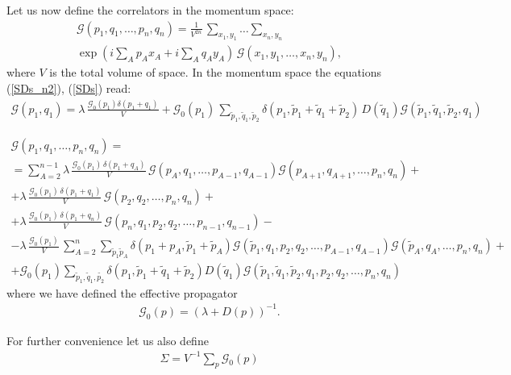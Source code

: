 \documentclass[twocolumn,showpacs,preprintnumbers,superscriptaddress,amsmath,floatfix,amssymb,secnumarabic]{revtex4}
\newcommand{\lr}[1]{ \left( #1 \right) }
\newcommand{\expa}[1]{ \exp{\left( #1 \right)} }
\begin{document}
\begin{widetext}
Let us now define the correlators in the momentum space:
\begin{eqnarray}
\label{momentum_space_def}
\mathcal{G}\lr{p_1, q_1, \ldots, p_n, q_n} = \frac{1}{V^{2 n}} \,
\sum\limits_{x_1, y_1} \ldots \sum\limits_{x_n, y_n} \,
\nonumber \\
\expa{i \sum\limits_A p_A x_A + i \sum\limits_A q_A y_A} \,
\mathcal{G}\lr{x_1, y_1, \ldots, x_n, y_n}  ,
\end{eqnarray}
where $V$ is the total volume of space. In the momentum space the equations (\ref{SDs_n2}), (\ref{SDs}) read:
\begin{eqnarray}
\label{SDs_n2_momentum}
 \mathcal{G}\lr{p_1, q_1} = \lambda \, \frac{\mathcal{G}_0\lr{p_1} \delta\lr{p_1 + q_1}}{V}
 +
 \mathcal{G}_0\lr{p_1} \,
\sum\limits_{\tilde{p}_1, \tilde{q}_1, \tilde{p}_2}
\delta\lr{p_1, \tilde{p}_1 + \tilde{q}_1 + \tilde{p}_2} \,
D\lr{\tilde{q}_1} \mathcal{G}\lr{\tilde{p}_1, \tilde{q}_1, \tilde{p}_2, q_1}
\end{eqnarray}

\begin{eqnarray}
\label{SDs_pcm_momentum}
 \mathcal{G}\lr{p_1, q_1, \ldots, p_n, q_n}
 = \nonumber \\ =
 \sum\limits_{A=2}^{n-1}
 \lambda \, \frac{\mathcal{G}_0\lr{p_1} \, \delta\lr{p_1 + q_A}}{V} \,
 \mathcal{G}\lr{    p_A,     q_1, \ldots, p_{A-1}, q_{A-1}}
 \mathcal{G}\lr{p_{A+1}, q_{A+1}, \ldots,     p_n,    q_n }
 + \nonumber \\ +
 \lambda \, \frac{\mathcal{G}_0\lr{p_1} \, \delta\lr{p_1 + q_1}}{V} \,
 \mathcal{G}\lr{p_2, q_2, \ldots, p_n, q_n}
 + \nonumber \\ +
 \lambda \, \frac{\mathcal{G}_0\lr{p_1} \, \delta\lr{p_1 + q_n}}{V} \,
 \mathcal{G}\lr{p_n, q_1, p_2, q_2, \ldots, p_{n-1}, q_{n-1}}
 - \nonumber \\ -
 \lambda \, \frac{\mathcal{G}_0\lr{p_1}}{V} \,
 \sum\limits_{A=2}^{n}
 \sum\limits_{\tilde{p}_1 \tilde{p}_A} \delta\lr{p_1 + p_A, \tilde{p}_1 + \tilde{p}_A}
 \mathcal{G}\lr{\tilde{p}_1, q_1, p_2, q_2, \ldots, p_{A-1}, q_{A-1}}
 \mathcal{G}\lr{\tilde{p}_A, q_A,           \ldots, p_n, q_n}
 + \nonumber \\ +
 \mathcal{G}_0\lr{p_1}
 \sum\limits_{\tilde{p}_1, \tilde{q}_1, \tilde{p_2}}
 \delta\lr{p_1, \tilde{p}_1 + \tilde{q}_1 + \tilde{p}_2} D\lr{\tilde{q}_1}
 \mathcal{G}\lr{\tilde{p}_1, \tilde{q}_1, \tilde{p}_2, q_1, p_2, q_2, \ldots, p_n, q_n}
\end{eqnarray}
where we have defined the effective propagator
\begin{eqnarray}
\label{free_prop_def}
\mathcal{G}_0\lr{p} = \lr{\lambda + D\lr{p}}^{-1} .
\end{eqnarray}
\end{widetext}
For further convenience let us also define
\begin{eqnarray}
\label{prop_norm_def}
\Sigma = V^{-1} \sum\limits_{p} \mathcal{G}_0\lr{p}
\end{eqnarray}
\end{document}
